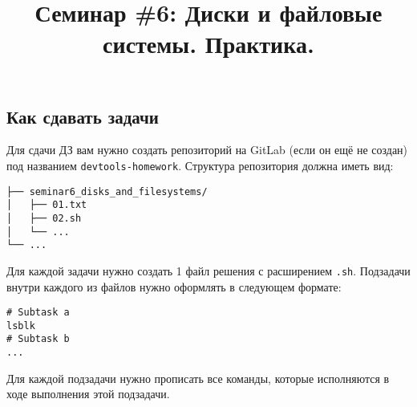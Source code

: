 \documentclass{article}
\begin{document}
\title{Семинар \#6: Диски и файловые системы. Практика. \vspace{-5ex}}\date{}\maketitle
\subsection*{Как сдавать задачи}
Для сдачи ДЗ вам нужно создать репозиторий на GitLab (если он ещё не создан) под названием \texttt{devtools-homework}. Структура репозитория должна иметь вид:
\begin{center}
\begin{BVerbatim}
├── seminar6_disks_and_filesystems/
│   ├── 01.txt
│   ├── 02.sh
│   └── ...
└── ...
\end{BVerbatim}
\end{center}
Для каждой задачи нужно создать 1 файл решения с расширением \texttt{.sh}. Подзадачи внутри каждого из файлов нужно оформлять в следующем формате:
\begin{lstlisting}
# Subtask a
lsblk
# Subtask b
...
\end{lstlisting}
Для каждой подзадачи нужно прописать все команды, которые исполняются в ходе выполнения этой подзадачи.\\
\end{document}

